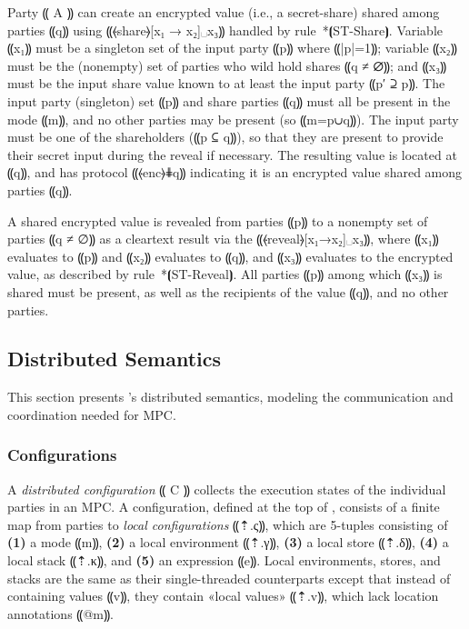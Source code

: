 Party ⸨ A ⸩ can create an encrypted value (i.e., a
secret-share) shared among parties ⸨q⸩ using ⸨⦑share⦒[x₁ → x₂]␣x₃⸩ handled by
rule~*⦗ST-Share⦘. Variable ⸨x₁⸩ must be a singleton set of the input party
⸨p⸩ where ⸨|p|=1⸩; variable ⸨x₂⸩ must be the (nonempty) set of parties
who wild hold shares ⸨q ≠ ∅⸩; and
⸨x₃⸩ must be the input share value known to at least the input party ⸨p′ ⊇ p⸩.
The input party (singleton) set ⸨p⸩ and share parties ⸨q⸩ must all be present in
the mode ⸨m⸩, and no other parties may be present (so ⸨m=p∪q⸩). The input party
must be one of the shareholders (⸨p ⊆ q⸩), so that they are present to provide their secret
input during the reveal if necessary. The resulting value is located at ⸨q⸩, and has protocol
⸨⦑enc⦒⋕q⸩ indicating it is an encrypted value shared among parties ⸨q⸩.

A shared encrypted value is revealed from parties ⸨p⸩ to a nonempty set of
parties ⸨q ≠ ∅⸩ as a cleartext result via the ⸨⦑reveal⦒[x₁→x₂]␣x₃⸩, where ⸨x₁⸩
evaluates to ⸨p⸩ and ⸨x₂⸩ evaluates to ⸨q⸩, and ⸨x₃⸩ evaluates to the encrypted
value, as described by rule~*⦗ST-Reveal⦘. All parties ⸨p⸩ among which ⸨x₃⸩
is shared must be present, as well as the recipients of the value ⸨q⸩, and no
other parties.

\subsection{Distributed Semantics}
\label{subsec:mpc-design-dist}

This section presents \mpc's distributed semantics, modeling the
communication and coordination needed for MPC.

\subsubsection{Configurations}
\label{subsubsec:mpc-design-dist-config}


A \emph{distributed configuration} ⸨ C ⸩ collects the execution states
of the individual parties in an MPC\@. A configuration, defined at the top of
, consists of a finite map from parties to \emph{local configurations} ⸨⇡.ς⸩,
which are 5-tuples consisting of %
\textbf{(1)} a mode ⸨m⸩, %
\textbf{(2)} a local environment ⸨⇡.γ⸩, %
\textbf{(3)} a local store ⸨⇡.δ⸩, %
\textbf{(4)} a local stack ⸨⇡.κ⸩, and %
\textbf{(5)} an expression ⸨e⸩.
Local environments, stores, and stacks are the same as their
single-threaded counterparts except that instead of containing
values ⸨v⸩, they contain «local values» ⸨⇡.v⸩, which lack location
annotations ⸨@m⸩.

